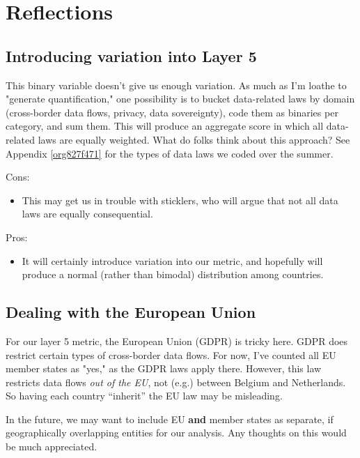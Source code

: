 \documentclass[11pt]{article}
\begin{document}
\section{Reflections}
\label{sec:org85bfbdd}

\subsection{Introducing variation into Layer 5}
\label{sec:org4730c62}
\label{orgc398867}

This binary variable doesn't give us enough variation. As much as I'm loathe to
"generate quantification," one possibility is to bucket data-related laws by
domain (cross-border data flows, privacy, data sovereignty), code them as binaries
per category, and sum them. This will produce an aggregate score in which all
data-related laws are equally weighted. What do folks think about this approach?
See Appendix \ref{org827f471} for the types of data laws we coded over the summer.


Cons:
\begin{itemize}
\item This may get us in trouble with sticklers, who will argue that not all data
laws are equally consequential.
\end{itemize}

Pros:
\begin{itemize}
\item It will certainly introduce variation into our metric, and hopefully will
produce a normal (rather than bimodal) distribution among countries.
\end{itemize}

\subsection{Dealing with the European Union}
\label{sec:orgd46a40c}

For our layer 5 metric, the European Union (GDPR) is tricky here. GDPR does
restrict certain types of cross-border data flows. For now, I've counted all EU
member states as "yes," as the GDPR laws apply there. However, this law
restricts data flows \emph{out of the EU}, not (e.g.) between Belgium and
Netherlands. So having each country ``inherit'' the EU law may be misleading.

In the future, we may want to include EU \textbf{and} member states as separate, if
geographically overlapping entities for our analysis. Any thoughts on this would
be much appreciated.
\end{document}
